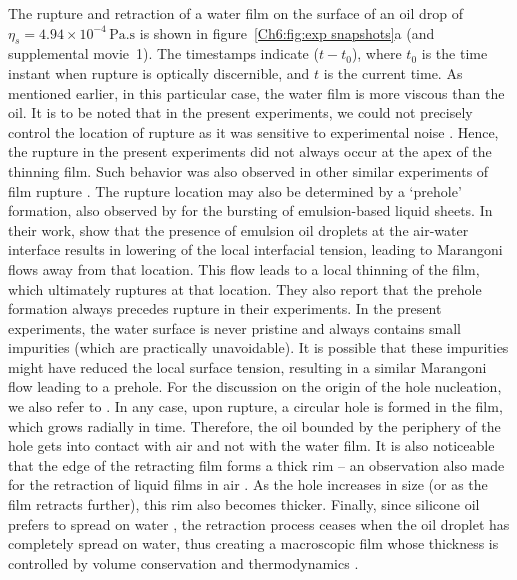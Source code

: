 The rupture and retraction of a water film on the surface of an oil drop of $\eta_{s} = 4.94 \times 10^{-4}\,\si{\pascal}.\si{\second}$ is shown in figure~\ref{Ch6:fig:exp snapshots}a (and supplemental movie~{\color{Myfig}1}). The timestamps indicate ($t - t_{0}$), where $t_{0}$ is the time instant when rupture is optically discernible, and $t$ is the current time. As mentioned earlier, in this particular case, the water film is more viscous than the oil. It is to be noted that in the present experiments, we could not precisely control the location of rupture as it was sensitive to experimental noise \citep[see \S~4.2 of][]{villermaux2020fragmentation}. Hence, the rupture in the present experiments did not always occur at the apex of the thinning film. Such behavior was also observed in other similar experiments of film rupture \citep{oldenziel-2012-pof, demaleprade-2016-prl}. The rupture location may also be determined by a `prehole' formation, also observed by \citet{vernay-2015-prl} for the bursting of emulsion-based liquid sheets. In their work, \citet{vernay-2015-prl} show that the presence of emulsion oil droplets at the air-water interface results in lowering of the local interfacial tension, leading to Marangoni flows away from that location. This flow leads to a local thinning of the film, which ultimately ruptures at that location. They also report that the prehole formation always precedes rupture in their experiments. In the present experiments, the water surface is never pristine and always contains small impurities (which are practically unavoidable). It is possible that these impurities might have reduced the local surface tension, resulting in a similar Marangoni flow leading to a prehole. For the discussion on the origin of the hole nucleation, we also refer to \citet{lohse-2020-pnas}. In any case, upon rupture, a circular hole is formed in the film, which grows radially in time. Therefore, the oil bounded by the periphery of the hole gets into contact with air and not with the water film. It is also noticeable that the edge of the retracting film forms a thick rim -- an observation also made for the retraction of liquid films in air \citep{pandit-1990-jfm, brenner-1999-pof, sunderhauf-2002-pof}. As the hole increases in size (or as the film retracts further), this rim also becomes thicker. Finally, since silicone oil prefers to spread on water \citep{li-2020-pnas}, the retraction process ceases when the oil droplet has completely spread on water, thus creating a macroscopic film whose thickness is controlled by volume conservation and thermodynamics \citep{book-degennes}. 

